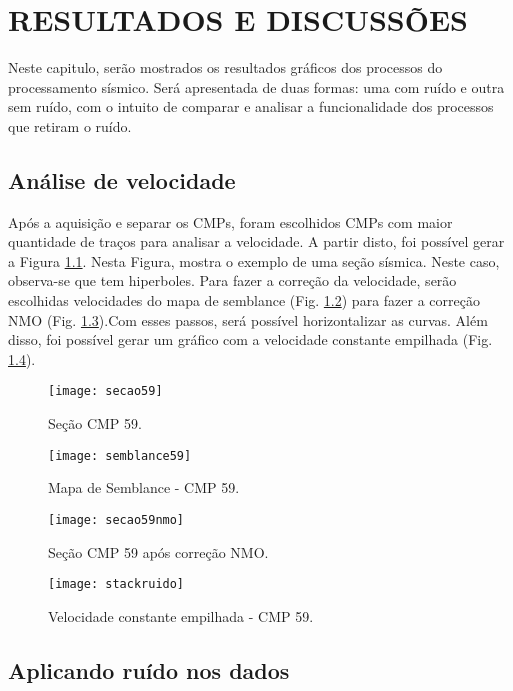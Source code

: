 \chapter{RESULTADOS E DISCUSSÕES}
\label{cap4}

Neste capitulo, serão mostrados os resultados gráficos dos processos do processamento sísmico. Será apresentada de duas formas: uma com ruído e outra sem ruído, com o intuito de comparar e analisar a funcionalidade dos processos que retiram o ruído. 

\section{Análise de velocidade}

Após a aquisição e separar os CMPs, foram escolhidos CMPs com maior quantidade de traços para analisar a velocidade. A partir disto, foi possível gerar a Figura  \ref{fig:secao53}. Nesta Figura, mostra o exemplo de uma seção sísmica. Neste caso, observa-se que tem hiperboles. Para fazer a correção da velocidade, serão escolhidas velocidades do mapa de semblance (Fig. \ref{fig:semblance59}) para fazer a correção NMO (Fig. \ref{fig:secao59nmo}).Com esses passos, será possível horizontalizar as curvas. Além disso, foi possível gerar um gráfico com a velocidade constante empilhada (Fig. \ref{fig:stackruido}).



\begin{figure}[ht!]
	\centering
	\texttt{[image: secao59]}
	\caption{Seção CMP 59.} \label{fig:secao53}
\end{figure} 

\begin{figure}[ht!]
	\centering
	\texttt{[image: semblance59]}
	\caption{Mapa de Semblance - CMP 59.} \label{fig:semblance59}
\end{figure}

\begin{figure}[ht!]
	\centering
	\texttt{[image: secao59nmo]}
	\caption{Seção CMP 59 após correção NMO.} \label{fig:secao59nmo}
\end{figure}

\begin{figure}[ht!]
	\centering
	\texttt{[image: stackruido]}
	\caption{Velocidade constante empilhada - CMP 59.} \label{fig:stackruido}
\end{figure}

\section{Aplicando ruído nos dados}

